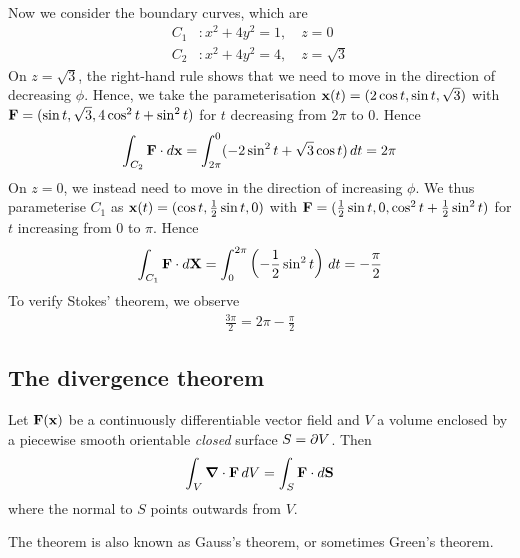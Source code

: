 \documentclass{../../template/note}
\begin{document}
\begin{example*}[hard]
\begin{align*}
        \end{align*}
        Now we consider the boundary curves, which are
        \begin{align*}
            C_1&: x^2 + 4y^2 = 1, \quad z = 0 \\
            C_2&: x^2 + 4y^2 = 4, \quad z = \sqrt 3
        \end{align*}
        On \(z = \sqrt 3\), the right-hand rule shows that we need to move in the direction of decreasing \(\phi\). Hence, we take the parameterisation \(\V x(t) = (2 \cos t, \sin t, \sqrt 3)\) with \(\V F = (\sin t, \sqrt 3, 4\cos^2 t + \sin^2 t)\) for \(t\) decreasing from \(2\pi\) to 0. Hence
        \begin{align*}
            \int_{C_2} \V F \cdot d \V x = \int_{2\pi}^0 (-2 \sin^2 t + \sqrt 3 \cos t) \D t = 2 \pi
        \end{align*}
        On \(z = 0\), we instead need to move in the direction of increasing \(\phi\). We thus parameterise \(C_1\) as \(\V x(t) = (\cos t, \frac 1 2 \sin t, 0)\) with \(\V F = (\frac 1 2 \sin t, 0, \cos^2 t + \frac 1 2 \sin^2 t)\) for \(t\) increasing from 0 to \(\pi\). Hence
        \begin{align*}
            \int_{C_1} \V F \cdot d \V X = \int_0^{2\pi} \left(-\frac 1 2 \sin^2 t\right) \D t = -\frac{\pi} 2
        \end{align*}
        To verify Stokes' theorem, we observe
        \begin{align*}
            \frac{3\pi} 2 = 2 \pi - \frac{\pi} 2
        \end{align*}
    \end{example*}

    \subsection{The divergence theorem}

    \begin{theorem}
        \label{6.3}
        Let \(\V F(\V x)\) be a continuously differentiable vector field and \(V\) a volume enclosed by a piecewise smooth orientable \emph{closed} surface \(S = \partial V\). Then
        \begin{align*}
            \int_V \div \V F \, d V = \int_S \V F \cdot d \V S
        \end{align*}
        where the normal to \(S\) points outwards from \(V\).        
    \end{theorem}
    The theorem is also known as Gauss's theorem, or sometimes Green's theorem.
\end{document}
